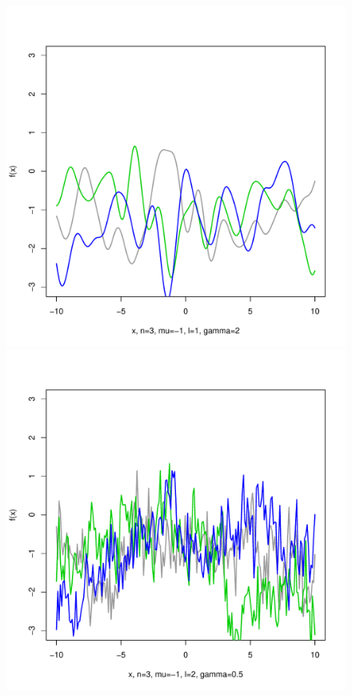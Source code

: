 \documentclass[12pt,letterpaper]{article}
\begin{document}
\begin{figure}
\begin{center}
\includegraphics[scale=0.2]{hw321/n3-m-1-l1-g4.pdf}
\includegraphics[scale=0.2]{hw321/n3-m-1-l2-g1.pdf}

\end{center}
\end{figure}
\end{document}
